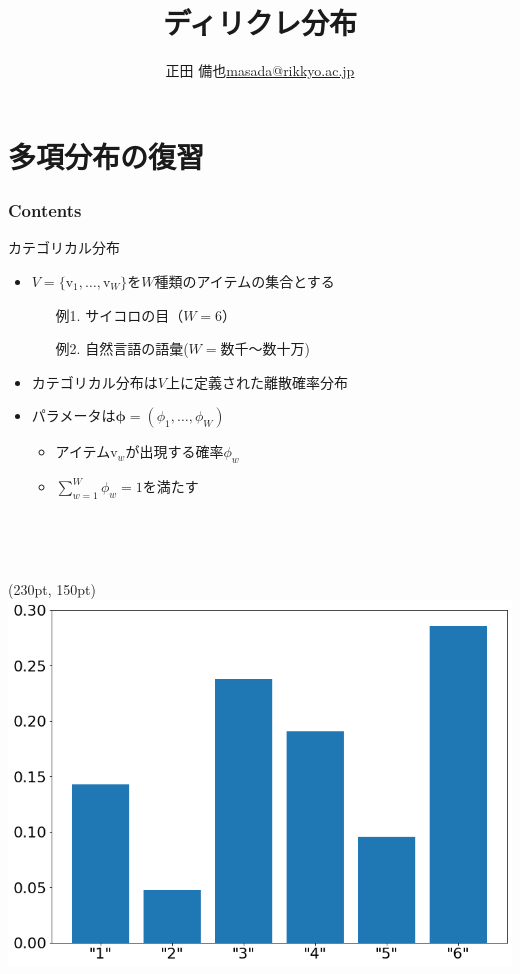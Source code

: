 \documentclass[aspectratio=169,unicode,dvipdfmx,14pt]{beamer}
\title{ \\ディリクレ分布}
\author{\texorpdfstring{正田 備也\newline\href{mailto:masada@rikkyo.ac.jp}{masada@rikkyo.ac.jp}}{正田 備也}}
\date{}
\begin{document}
\begin{frame}
\titlepage
\end{frame}

\section{多項分布の復習}

\begin{frame}\frametitle{Contents}
\Large \tableofcontents[currentsection]
\end{frame}

\begin{frame}{カテゴリカル分布}
\begin{itemize}
\item $V=\{\mbox{v}_1,\ldots,\mbox{v}_W\}$を$W$種類のアイテムの集合とする
\begin{itemize}
\item[例1.] サイコロの目（$W=6$）
\item[例2.] 自然言語の語彙($W=\mbox{数千〜数十万}$)
\end{itemize}
\item カテゴリカル分布は$V$上に定義された離散確率分布
\item パラメータは$\bm{\phi}=(\phi_1,\ldots,\phi_W)$
\begin{itemize}
\item アイテム$\mbox{v}_w$が出現する確率$\phi_w$
\item $\sum_{w=1}^W \phi_w = 1$を満たす
\item[] \ 
\item[] \ 
\end{itemize}
\end{itemize}
\begin{textblock*}{0.5\linewidth}(230pt, 150pt)
    \centering
    \includegraphics[width=0.7\linewidth]{dice_bar_chart.png}
\end{textblock*}
\end{frame}
\end{document}

